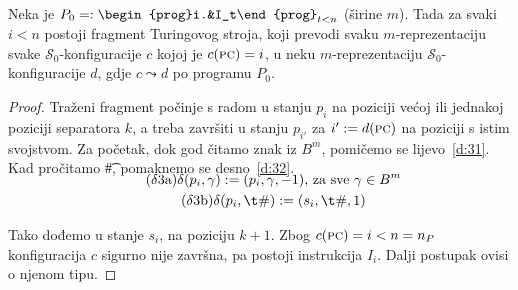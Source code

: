 \begin{lema}[{name=[{izvršavanje RAM-instrukcija na Turingovom stroju}]}]\label{lm:gadgets}
    Neka je $P_0=:\begin{prog}i.&I_t\end{prog}_{t<n}$ (širine $m$). Tada za svaki $i<n$ postoji fragment Turingovog stroja, koji prevodi svaku $m$-reprezentaciju svake $\mathcal S_0$-konfiguracije $c$ kojoj je $c(\textsc{pc})=i$, u neku $m$-reprezentaciju $\mathcal S_0$-konfiguracije $d$, gdje $c\leadsto d$ po programu $P_0$.
\end{lema}
\begin{proof}
Traženi fragment počinje s radom u stanju $p_i$ na poziciji većoj ili jednakoj poziciji separatora $k$, a treba završiti u stanju $p_{i'}$ za $i':=d(\textsc{pc})$ na poziciji s istim svojstvom. Za početak, dok god čitamo znak iz $B^m$, pomičemo se lijevo~\eqref{d:31}. Kad pročitamo \t\#, pomaknemo se desno~\eqref{d:32}. 
\begin{gather*}
	\SwapAboveDisplaySkip
\label{d:31}\tag{$\delta$3a}
    \delta(p_i,\gamma):=(p_i,\gamma,-1)\text{, za sve }\gamma\in B^m\\
\label{d:32}\tag{$\delta$3b}
    \delta(p_i,\t\#):=(s_i,\t\#,1)
\end{gather*}

Tako dođemo u stanje $s_i$, na poziciju $k+1$. Zbog $c(\textsc{pc})=i<n=n_P$ konfiguracija $c$ sigurno nije završna, pa postoji instrukcija $I_i$. Dalji postupak ovisi o njenom tipu.


\end{proof}
